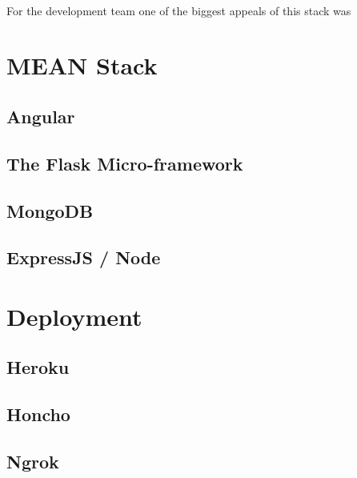 \paragraph{}


\paragraph{}
For the development team one of the biggest appeals of this stack was 

\section{MEAN Stack}
\subsection{Angular}
\subsection{The Flask Micro-framework}
\subsection{MongoDB}
\subsection{ExpressJS / Node}

\section{Deployment}
\subsection{Heroku}
\subsection{Honcho}
\subsection{Ngrok}
